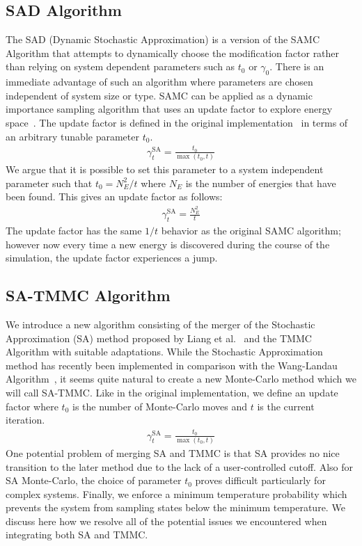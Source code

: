 \documentclass[letterpaper,twocolumn,amsmath,amssymb,pre,aps,10pt]{revtex4-1}
\begin{document}
\subsection{SAD Algorithm}
The SAD (Dynamic Stochastic Approximation) is a version of the SAMC Algorithm that attempts to dynamically choose the modification factor rather than relying on system dependent parameters such as $t_0$ or $\gamma_0$.  There is an immediate advantage of such an algorithm where parameters are chosen independent of system size or type. SAMC can be applied as a dynamic importance sampling algorithm that uses an update factor to explore energy space~\cite{liang2007stochastic, werlich2015stochastic, schneider2017convergence}.  The update factor is defined in the original implementation~\cite{liang2007stochastic} in terms of an arbitrary tunable parameter $t_0$.
\begin{align}
\gamma_{t}^{\text{SA}} = \frac{t_0}{\max(t_0,t)}
\end{align}
We argue that it is possible to set this parameter to a system independent parameter such that $t_0 = N_E^2/t$ where $N_E$ is the number of energies that have been found.  This gives an update factor as follows:
\begin{align}
\gamma_{t}^{\text{SA}} = \frac{N_E^2}{t}
\end{align}
The update factor has the same $1/t$ behavior as the original SAMC algorithm; however now every time a new energy is discovered during the course of the simulation, the update factor experiences a jump.

\subsection{SA-TMMC Algorithm}
We introduce a new algorithm consisting of the merger of the Stochastic Approximation (SA) method proposed by Liang et al.~\cite{liang2007stochastic} and the TMMC Algorithm with suitable adaptations.  While the Stochastic Approximation method has recently been implemented in comparison with the Wang-Landau Algorithm~\cite{werlich2015stochastic, schneider2017convergence}, it seems quite natural to create a new Monte-Carlo method which we will call SA-TMMC.  Like in the original implementation, we define an update factor where $t_0$ is the number of Monte-Carlo moves and $t$ is the current iteration.  
\begin{align}
\gamma_{t}^{\text{SA}} = \frac{t_0}{\max(t_0,t)}
\end{align}
One potential problem of merging SA and TMMC is that SA provides no nice transition to the later method due to the lack of a user-controlled cutoff.  Also for SA Monte-Carlo, the choice of parameter $t_0$ proves difficult particularly for complex systems.  Finally, we enforce a minimum temperature probability which prevents the system from sampling states below the minimum temperature.  We discuss here how we resolve all of the potential issues we encountered when integrating both SA and TMMC. 
\end{document}

